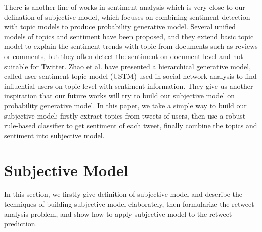 \documentclass{acm_proc_article-sp}
\begin{document}
There is another line of works in sentiment analysis which is very close to our defination of subjective model, which focuses on combining sentiment detection with topic models to produce probability generative model. 
Several unified models of topics and sentiment have been proposed, and they extend basic topic model to explain the sentiment trends with topic from documents such as reviews or comments\cite{Mei:2007TSM,Lin:2009JSM,Jo:2011ASU}, but they often detect the sentiment on document level and not suitable for Twitter.
Zhao et al.\cite{Zhao:2012UTM} have presented a hierarchical generative model, called user-sentiment topic model (USTM) used in social network analysis to find influential users on topic level with sentiment information.
They give us another inspiration that our future works will try to build our subjective model on probability generative model.
In this paper, we take a simple way to build our subjective model: firstly extract topics from tweets of users, then use a robust rule-based classifier to get sentiment of each tweet, finally combine the topics and sentiment into subjective model.
\section{Subjective Model}
In this section, we firstly give definition of subjective model and describe the techniques of building subjective model elaborately, then formularize the retweet analysis problem, and show how to apply subjective model to the retweet prediction.
\end{document}
